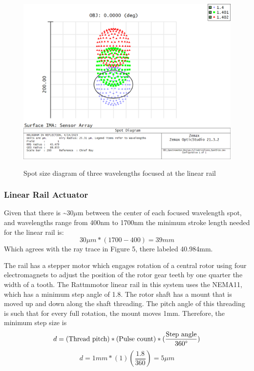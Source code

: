 \documentclass[journal]{IEEEtran}
\begin{document}
\begin{figure}[H]
    \centering
    \includegraphics[width=\linewidth]{images/SpotDiagram.png}
    \label{fig:spot-size-diagram}
    \caption{Spot size diagram of three wavelengths focused at the linear rail}
\end{figure}
\subsubsection{Linear Rail Actuator}
Given that there is \~{}30$\mu $m between the center of each focused wavelength spot, and wavelengths range from 400nm to 1700nm the minimum stroke length needed for the linear rail is:
\begin{equation}
    30\mu m*(1700-400) = 39 mm
\end{equation}
Which agrees with the ray trace in Figure 5, there labeled 40.984mm.

The rail has a stepper motor which engages rotation of a central rotor using four electromagnets to adjust the position of the rotor gear teeth by one quarter the width of a tooth. The Rattmmotor linear rail in this system uses the NEMA11, which has a minimum step angle of 1.8\textdegree. The rotor shaft has a mount that is moved up and down along the shaft threading. The pitch angle of this threading is such that for every full rotation, the mount moves 1mm. Therefore, the minimum step size is
\begin{equation}
    d = (\text{Thread pitch})*(\text{Pulse count})*(\frac{\text{Step angle}}{360\text{\textdegree}})
\end{equation}
\begin{equation}
    d = 1 mm*(1)(\frac{1.8}{360}) = 5\mu m
\end{equation}
\end{document}

